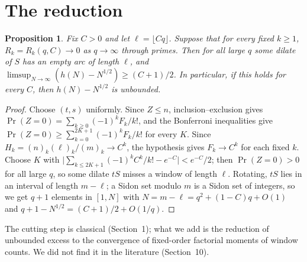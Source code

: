 \documentclass[11pt]{article}
\newtheorem{proposition}{Proposition}
\begin{document}
\section{The reduction}\label{sec:red}
\begin{proposition}\label{prop:red}
Fix $C>0$ and let $\ell=\lfloor Cq\rfloor$. Suppose that for every fixed $k\ge1$, $R_k=R_k(q,C)\to0$ as $q\to\infty$ through primes.
Then for all large $q$ some dilate of $S$ has an empty arc of length $\ell$, and $\limsup_{N\to\infty}(h(N)-N^{1/2})\ge(C+1)/2$.
In particular, if this holds for every $C$, then $h(N)-N^{1/2}$ is unbounded.
\end{proposition}
\begin{proof}
Choose $(t,s)$ uniformly. Since $Z\le n$, inclusion--exclusion gives $\Pr(Z=0)=\sum_{k\ge0}(-1)^kF_k/k!$, and the Bonferroni
inequalities give $\Pr(Z=0)\ge\sum_{k=0}^{2K+1}(-1)^kF_k/k!$ for every $K$. Since $H_k=(n)_k(\ell)_k/(m)_k\to C^k$, the hypothesis gives
$F_k\to C^k$ for each fixed $k$. Choose $K$ with $\bigl|\sum_{k\le2K+1}(-1)^kC^k/k!-e^{-C}\bigr|<e^{-C}/2$; then $\Pr(Z=0)>0$ for all
large $q$, so some dilate $tS$ misses a window of length $\ell$. Rotating, $tS$ lies in an interval of length $m-\ell$; a Sidon set
modulo $m$ is a Sidon set of integers, so we get $q+1$ elements in $[1,N]$ with $N=m-\ell=q^2+(1-C)q+O(1)$ and
$q+1-N^{1/2}=(C+1)/2+O(1/q)$.
\end{proof}
The cutting step is classical (Section~1); what we add is the reduction of unbounded excess to the convergence of fixed-order factorial
moments of window counts. We did not find it in the literature (Section~10).
\end{document}
